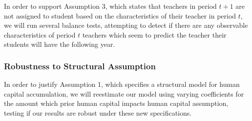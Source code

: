 \documentclass{article}
\begin{document}
In order to support Assumption 3, which states that teachers in period $t+1$ are not assigned to student based on the characteristics of their teacher in period $t$, we will run several balance tests, attempting to detect if there are any observable characteristics of period $t$ teachers which seem to predict the teacher their students will have the following year. 

\subsubsection*{Robustness to Structural Assumption}

In order to justify Assumption 1, which specifies a structural model for human capital accumulation, we will reestimate our model using varying coefficients for the amount which prior human capital impacts human capital assumption, testing if our results are robust under these new specifications. 
\end{document}
